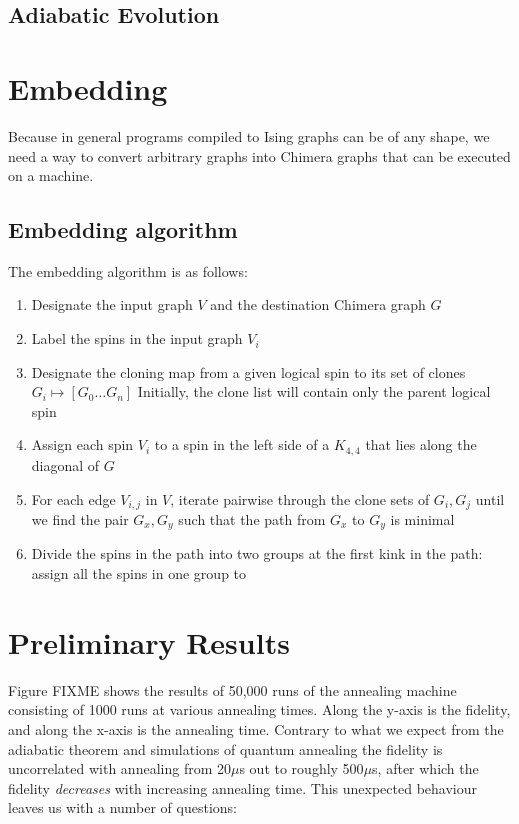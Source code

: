 \documentclass[12pt]{dalthesis}
\begin{document}
\section{Adiabatic Evolution}

\chapter{Embedding}
Because in general programs compiled to Ising graphs can be of any shape, we need a way to convert arbitrary graphs into Chimera graphs that can be executed on a machine.

\section{ Embedding algorithm}

The embedding algorithm is as follows:

\begin{enumerate}
	\item Designate the input graph $V$ and the destination Chimera graph $G$
	\item Label the spins in the input graph $V_i$
	\item Designate the cloning map from a given logical spin to its set of clones $G_i \mapsto [G_0 \ldots G_n] $ Initially, the
		clone list will contain only the parent logical spin
	\item Assign each spin $V_i$ to a spin in the left side of a $K_{4,4}$ that lies along the diagonal of $G$
	\item For each edge $V_{i,j}$ in $V$, iterate pairwise through the clone sets of $G_i,G_j$ until we find the pair $G_x,G_y$ such that
		the path from $G_x$ to $G_y$ is minimal
	\item Divide the spins in the path into two groups at the first kink in the path: assign all the spins in one group to 
\end{enumerate}

\chapter{Preliminary Results}

Figure FIXME shows the results of 50,000 runs of the annealing machine consisting of 1000 runs at various annealing times.  Along the y-axis is the fidelity, and along the x-axis is the annealing time.  Contrary to what we expect from the adiabatic theorem and simulations of quantum annealing the fidelity is uncorrelated with annealing from 20$\mu$s out to roughly 500$ \mu$s, after which the fidelity \emph{decreases} with increasing annealing time.  This unexpected behaviour leaves us with a number of questions:
\end{document}
